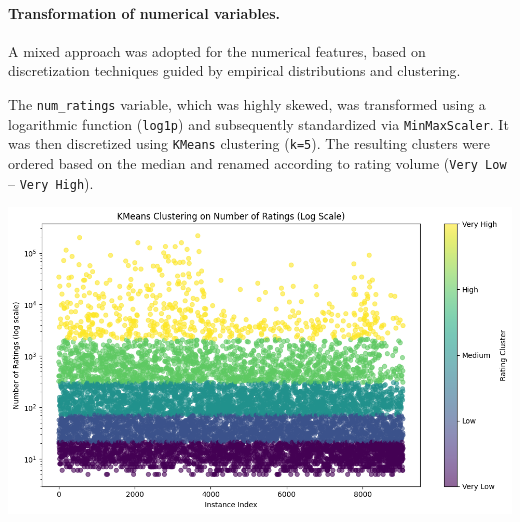 \documentclass[10pt]{article}
\begin{document}
\begin{minipage}{0.58\textwidth}
\paragraph{Transformation of numerical variables.}
A mixed approach was adopted for the numerical features, based on discretization techniques guided by empirical distributions and clustering.

The \texttt{num\_ratings} variable, which was highly skewed, was transformed using a logarithmic function (\texttt{log1p}) and subsequently standardized via \texttt{MinMaxScaler}. It was then discretized using \texttt{KMeans} clustering (\texttt{k=5}). The resulting clusters were ordered based on the median and renamed according to rating volume (\texttt{Very Low} -- \texttt{Very High}).
\end{minipage}
\hfill
\begin{minipage}{0.4\textwidth}
\centering
\includegraphics[width=\linewidth]{Kmeans_num_rating.png}
\label{fig:enter-label}
\end{minipage}
\end{document}
